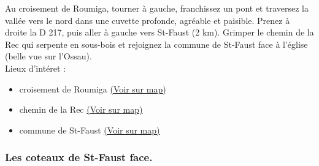 \documentclass[titlepage]{article}
\begin{document}
                        Au croisement de Roumiga, tourner à gauche, franchissez un pont et traversez la vallée vers le nord dans une cuvette profonde, agréable et paisible. Prenez à droite la D 217, puis aller à gauche vers St-Faust (2 km). Grimper le chemin de la Rec qui serpente en sous-bois et rejoignez la commune de St-Faust face à l'église (belle vue sur l'Ossau).
                    \\
        Lieux d'intéret : 
        \begin{itemize}
        
        \item {
        croisement de
                            Roumiga 
        \href{https://www.google.com/maps/?q=43.287530, -0.391115}{(Voir sur map)}
        }
    
        \item {
        chemin de la
                            Rec 
        \href{https://www.google.com/maps/?q=43.287530, -0.391115}{(Voir sur map)}
        }
    
        \item {
        commune de
                            St-Faust 
        \href{https://www.google.com/maps/?q=43.287530, -0.391115}{(Voir sur map)}
        }
    
        \end{itemize}
    
        
        \subsubsection{Les coteaux de St-Faust face.}
        \paragraph{}
        
\end{document}
